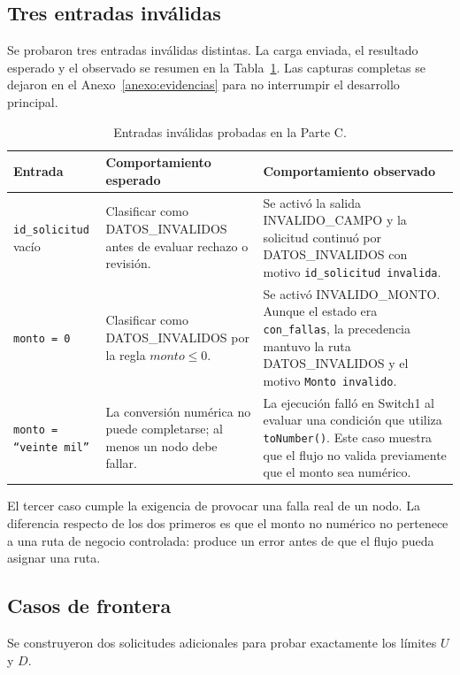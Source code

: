 \documentclass[10pt,a4paper]{article}
\begin{document}
\subsection{Tres entradas inválidas}

Se probaron tres entradas inválidas distintas. La carga enviada, el resultado esperado y el observado se resumen en la Tabla~\ref{tab:invalidas}. Las capturas completas se dejaron en el Anexo~\ref{anexo:evidencias} para no interrumpir el desarrollo principal.

\begin{table}[H]
\centering
\footnotesize
\begin{tabularx}{\textwidth}{p{} p{} X}
\toprule
Entrada & Comportamiento esperado & Comportamiento observado \\
\midrule
\texttt{id\_solicitud} vacío & Clasificar como DATOS\_INVALIDOS antes de evaluar rechazo o revisión. & Se activó la salida INVALIDO\_CAMPO y la solicitud continuó por DATOS\_INVALIDOS con motivo \texttt{id\_solicitud invalida}. \\
\addlinespace
\texttt{monto = 0} & Clasificar como DATOS\_INVALIDOS por la regla $monto\leq 0$. & Se activó INVALIDO\_MONTO. Aunque el estado era \texttt{con\_fallas}, la precedencia mantuvo la ruta DATOS\_INVALIDOS y el motivo \texttt{Monto invalido}. \\
\addlinespace
\texttt{monto = ``veinte mil''} & La conversión numérica no puede completarse; al menos un nodo debe fallar. & La ejecución falló en Switch1 al evaluar una condición que utiliza \texttt{toNumber()}. Este caso muestra que el flujo no valida previamente que el monto sea numérico. \\
\bottomrule
\end{tabularx}
\caption{Entradas inválidas probadas en la Parte C.}
\label{tab:invalidas}
\end{table}

El tercer caso cumple la exigencia de provocar una falla real de un nodo. La diferencia respecto de los dos primeros es que el monto no numérico no pertenece a una ruta de negocio controlada: produce un error antes de que el flujo pueda asignar una ruta.

\subsection{Casos de frontera}

Se construyeron dos solicitudes adicionales para probar exactamente los límites $U$ y $D$.
\end{document}
